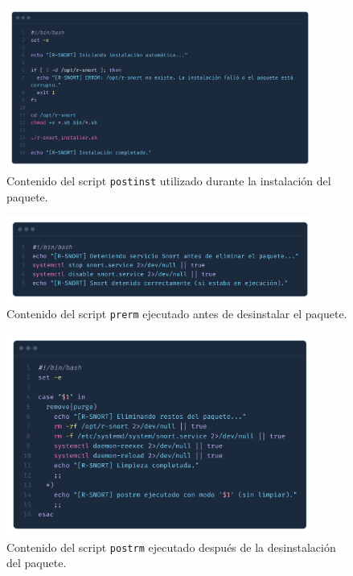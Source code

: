 \documentclass[11pt,a4paper,twoside]{report}
\begin{document}
\begin{figure}[H]
	\centering
	\includegraphics[width=0.9\textwidth]{script_automatico/15.png}
	\caption{Contenido del script \texttt{postinst} utilizado durante la instalación del paquete.}
	\label{fig:postinst}
\end{figure}

\begin{figure}[H]
	\centering
	\includegraphics[width=0.9\textwidth]{script_automatico/16.png}
	\caption{Contenido del script \texttt{prerm} ejecutado antes de desinstalar el paquete.}
	\label{fig:prerm}
\end{figure}

\begin{figure}[H]
	\centering
	\includegraphics[width=0.9\textwidth]{script_automatico/17.png}
	\caption{Contenido del script \texttt{postrm} ejecutado después de la desinstalación del paquete.}
	\label{fig:postrm}
\end{figure}
\end{document}
